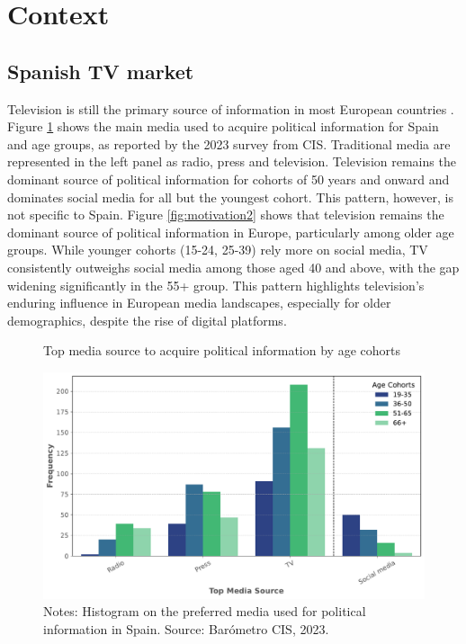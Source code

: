 \documentclass[12pt]{article}
\begin{document}
	
	
	
	
	\section{Context} 
	
	\label{section:context}
	
	
	\subsection{Spanish TV market}
	
	Television is still the primary source of information in most European countries \citep{europarl2024}. Figure \ref{fig:motivation} shows the main media used to acquire political information for Spain and age groups, as reported by the 2023 survey from CIS. Traditional media are represented in the left panel as radio, press and television. Television remains the dominant source of political information for cohorts of 50 years and onward and dominates social media for all but the youngest cohort. This pattern, however, is not specific to Spain. Figure \ref{fig:motivation2} shows that television remains the dominant source of political information in Europe, particularly among older age groups. While younger cohorts (15-24, 25-39) rely more on social media, TV consistently outweighs social media among those aged 40 and above, with the gap widening significantly in the 55+ group. This pattern highlights television’s enduring influence in European media landscapes, especially for older demographics, despite the rise of digital platforms.
	
	
	
	

	
	
	\begin{figure}[h!]
		\centering
		\caption{Top media source to acquire political information by age cohorts}
		\includegraphics[width=120mm]{figures/age_cohorts}
\caption*{\small Notes: Histogram on the preferred media used for political information in Spain.  
	Source: Barómetro CIS, 2023. }
\label{fig:motivation}
	\end{figure}
	
\end{document}
